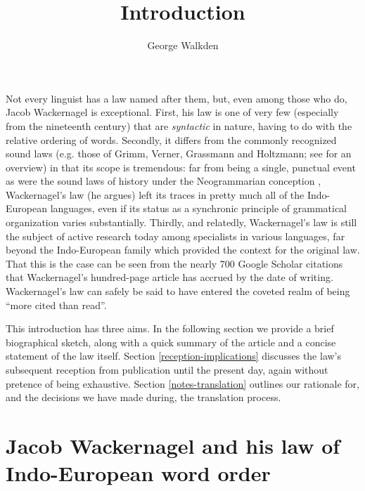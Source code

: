 \documentclass[output=paper]{../langscibook}
\author{George Walkden\affiliation{University of Konstanz}\orcid{0000-0001-5950-9686}}
\title{Introduction}
\begin{document}
\maketitle


Not every linguist has a law named after them, but, even among those who do, Jacob Wackernagel is exceptional. First, his law is one of very few (especially from the nineteenth century) that are \emph{syntactic} in nature, having to do with the relative ordering of words. Secondly, it differs from the commonly recognized sound laws (e.g. those of Grimm, Verner, Grassmann and Holtzmann; see \citealp{Collinge1985} for an overview) in that its scope is tremendous: far from being a single, punctual event as were the sound laws of history under the Neogrammarian conception \citep{OsthoffBrugmann1878}, Wackernagel's law (he argues) left its traces in pretty much all of the Indo-European languages, even if its status as a synchronic principle of grammatical organization varies substantially. Thirdly, and relatedly, Wackernagel's law is still the subject of active research today among specialists in various languages, far beyond the Indo-European family which provided the context for the original law. That this is the case can be seen from the nearly 700 Google Scholar citations that Wackernagel's \citeyearpar{Wackernagel1892} hundred-page article has accrued by the date of writing. Wackernagel's law can safely be said to have entered the coveted realm of being ``more cited than read''.

This introduction has three aims. In the following section we provide a brief biographical sketch, along with a quick summary of the article and a concise statement of the law itself. Section \ref{reception-implications} discusses the law's subsequent reception from publication until the present day, again without pretence of being exhaustive. Section \ref{notes-translation} outlines our rationale for, and the decisions we have made during, the translation process.

\section{Jacob Wackernagel and his law of Indo-European word order}\label{intro-biography}
\end{document}
